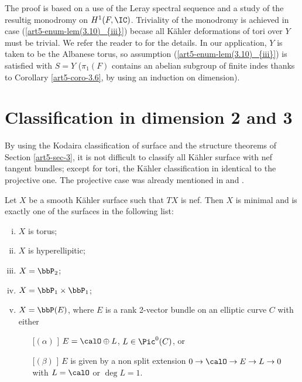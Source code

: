 The proof is based on a use of the Leray spectral sequence and a study of the resultig monodromy on $H^{1}(F, \IC)$. Triviality of the monodromy is achieved in case (\ref{art5-enum-lem(3.10)_{iii}}) becase all K\"ahler deformations of tori over $Y$ must be trivial. We refer the reader to \cite{art5-keyDPS91} for the details. In our application, $Y$ is taken to be the Albanese torus, so assumption (\ref{art5-enum-lem(3.10)_{iii}}) is satisfied with $S=Y$ ($\pi_{1}(F)$ contains an abelian subgroup of finite indes thanks to Corollary \ref{art5-coro-3.6}, by using an induction on dimension). 

\section{Classification in dimension 2 and 3}\label{art5-sec-4}

By using the Kodaira classification of surface and the structure theorems of Section \ref{art5-sec-3}, it is not difficult to classify all K\"ahler surface with nef tangent bundles; except for tori, the K\"ahler classification in identical to the projective one. The projective case was already mentioned in \cite{art5-keyCP91} and \cite{art5-keyZh90}.
    \begin{theorem}
    Let $X$ be a smooth K\"ahler surface such that $TX$ is nef. Then $X$ is minimal and is exactly one of the surfaces in the following list:
    \begin{enumerate}[(i)]
    \item $X$ is torus;\label{art5-enum-thm-(1)}
    \item $X$ is hyperellipitic;\label{art5-enum-thm-(ii)}
    \item $X= \bbP_{2}$;\label{art5-enum-thm-(iii)}
    \item $X= \bbP_{1} \times \bbP_{1}$;\label{art5-enum-thm-(iv)}
    \item $X = \bbP(E)$, where $E$ is a rank 2-vector bundle on an elliptic curve $C$ with either \label{art5-enum-thm-(v)}
        \begin{enumerate}
        \item [[$(\alpha)$]] $E= \calO \oplus L$, $L \in \Pic^{0}(C)$, or
        \item [[$(\beta)$]] $E$ is given by a non split extension $0 \rightarrow \calO \rightarrow E \rightarrow L \rightarrow 0$ with $L = \calO$ or $\deg L = 1$.
        \end{enumerate}
    \end{enumerate}
\end{theorem}

